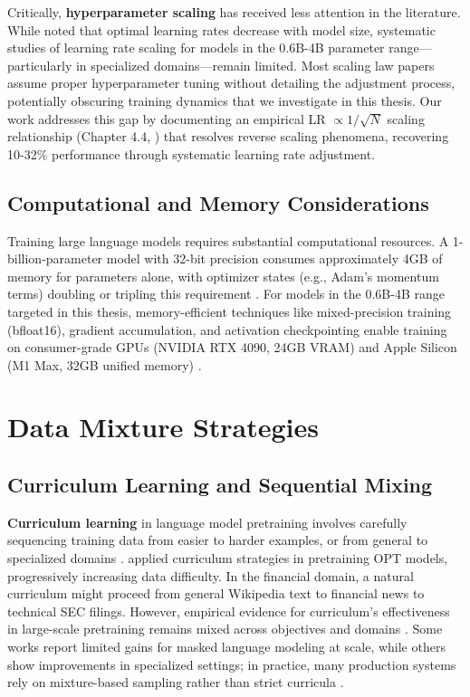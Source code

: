Critically, \textbf{hyperparameter scaling} has received less attention in the literature. While \textcite{mccandlish2018empirical} noted that optimal learning rates decrease with model size, systematic studies of learning rate scaling for models in the 0.6B-4B parameter range---particularly in specialized domains---remain limited. Most scaling law papers assume proper hyperparameter tuning without detailing the adjustment process, potentially obscuring training dynamics that we investigate in this thesis. Our work addresses this gap by documenting an empirical LR $\propto 1/\sqrt{N}$ scaling relationship (Chapter 4.4, ) that resolves reverse scaling phenomena, recovering 10-32\% performance through systematic learning rate adjustment.

\subsection{Computational and Memory Considerations}

Training large language models requires substantial computational resources. A 1-billion-parameter model with 32-bit precision consumes approximately 4GB of memory for parameters alone, with optimizer states (e.g., Adam's momentum terms) doubling or tripling this requirement \parencite{rajbhandari2020zero}. For models in the 0.6B-4B range targeted in this thesis, memory-efficient techniques like mixed-precision training (bfloat16), gradient accumulation, and activation checkpointing enable training on consumer-grade GPUs (NVIDIA RTX 4090, 24GB VRAM) and Apple Silicon (M1 Max, 32GB unified memory) \parencite{narayanan2021efficient}.

\section{Data Mixture Strategies}

\subsection{Curriculum Learning and Sequential Mixing}

\textbf{Curriculum learning} in language model pretraining involves carefully sequencing training data from easier to harder examples, or from general to specialized domains \parencite{bengio2009curriculum}. \textcite{wu2022opt} applied curriculum strategies in pretraining OPT models, progressively increasing data difficulty. In the financial domain, a natural curriculum might proceed from general Wikipedia text to financial news to technical SEC filings. However, empirical evidence for curriculum's effectiveness in large-scale pretraining remains mixed across objectives and domains \parencite{longpre2023pretrainer}. Some works report limited gains for masked language modeling at scale, while others show improvements in specialized settings; in practice, many production systems rely on mixture-based sampling rather than strict curricula \parencite{raffel2020exploring,wu2022opt}.

